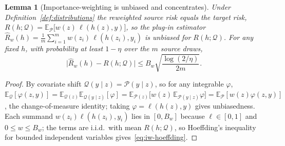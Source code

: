 \documentclass[aps,prresearch,reprint,amsmath,amssymb,nofootinbib,superscriptaddress,floatfix]{revtex4-2}
\newtheorem{lemma}[theorem]{Lemma}
\theoremstyle{definition}
\theoremstyle{remark}
\theoremstyle{plain}
\begin{document}
\begin{lemma}[Importance-weighting is unbiased and concentrates]
\label{lem:iw}
Under Definition~\ref{def:distributions} the reweighted source risk equals the target risk,
$R(h;\mathcal Q)=\mathbb E_{\mathcal P}\!\big[w(z)\,\ell(h(z),y)\big]$, so the plug-in estimator
$\widehat R_{w}(h)=\tfrac1m\sum_{i=1}^m w(z_i)\,\ell(h(z_i),y_i)$ is unbiased for $R(h;\mathcal Q)$. For any
fixed $h$, with probability at least $1-\eta$ over the $m$ source draws,
\begin{equation}
\big|\widehat R_{w}(h)-R(h;\mathcal Q)\big|\le B_w\sqrt{\frac{\log(2/\eta)}{2m}} .
\label{eq:iw-hoeffding}
\end{equation}
\end{lemma}
\begin{proof}
By covariate shift $\mathcal Q(y\mid z)=\mathcal P(y\mid z)$, so for any integrable $\varphi$,
$\mathbb E_{\mathcal Q}[\varphi(z,y)]=\mathbb E_{\mathcal Q(z)}\mathbb E_{\mathcal Q(y\mid z)}[\varphi]
=\mathbb E_{\mathcal P(z)}\big[w(z)\,\mathbb E_{\mathcal P(y\mid z)}\varphi\big]
=\mathbb E_{\mathcal P}[w(z)\varphi(z,y)]$, the change-of-measure identity; taking $\varphi=\ell(h(z),y)$
gives unbiasedness. Each summand $w(z_i)\ell(h(z_i),y_i)$ lies in $[0,B_w]$ because
$\ell\in[0,1]$ and $0\le w\le B_w$; the terms are i.i.d.\ with mean $R(h;\mathcal Q)$, so Hoeffding's
inequality for bounded independent variables gives~\eqref{eq:iw-hoeffding}.
\end{proof}
\end{document}
